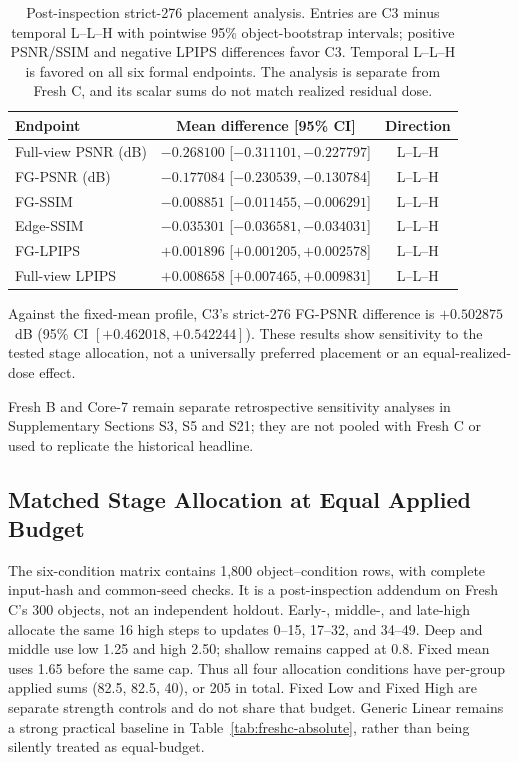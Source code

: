 \documentclass[times,twocolumn,final]{elsarticle}
\begin{document}
\begin{table}[t]
\centering
\scriptsize
\setlength{\tabcolsep}{4pt}
\caption{Post-inspection strict-276 placement analysis. Entries are C3 minus temporal L--L--H with pointwise 95\% object-bootstrap intervals; positive PSNR/SSIM and negative LPIPS differences favor C3. Temporal L--L--H is favored on all six formal endpoints. The analysis is separate from Fresh C, and its scalar sums do not match realized residual dose.}
\label{tab:temporal-placement}
\begin{tabular}{lcc}
\toprule
Endpoint & Mean difference [95\% CI] & Direction \\
\midrule
Full-view PSNR (dB) & $-0.268100$ [$-0.311101,-0.227797$] & L--L--H \\
FG-PSNR (dB) & $-0.177084$ [$-0.230539,-0.130784$] & L--L--H \\
FG-SSIM & $-0.008851$ [$-0.011455,-0.006291$] & L--L--H \\
Edge-SSIM & $-0.035301$ [$-0.036581,-0.034031$] & L--L--H \\
FG-LPIPS & $+0.001896$ [$+0.001205,+0.002578$] & L--L--H \\
Full-view LPIPS & $+0.008658$ [$+0.007465,+0.009831$] & L--L--H \\
\bottomrule
\end{tabular}
\end{table}

Against the fixed-mean profile, C3's strict-276 FG-PSNR difference is $+0.502875$~dB (95\% CI $[+0.462018,+0.542244]$). These results show sensitivity to the tested stage allocation, not a universally preferred placement or an equal-realized-dose effect.

Fresh B and Core-7 remain separate retrospective sensitivity analyses in Supplementary Sections S3, S5 and S21; they are not pooled with Fresh C or used to replicate the historical headline.

\subsection{Matched Stage Allocation at Equal Applied Budget}
\label{subsec:matched-budget300}
The six-condition matrix contains 1,800 object--condition rows, with complete input-hash and common-seed checks. It is a post-inspection addendum on Fresh C's 300 objects, not an independent holdout. Early-, middle-, and late-high allocate the same 16 high steps to updates 0--15, 17--32, and 34--49. Deep and middle use low 1.25 and high 2.50; shallow remains capped at 0.8. Fixed mean uses 1.65 before the same cap. Thus all four allocation conditions have per-group applied sums (82.5, 82.5, 40), or 205 in total. Fixed Low and Fixed High are separate strength controls and do not share that budget. Generic Linear remains a strong practical baseline in Table~\ref{tab:freshc-absolute}, rather than being silently treated as equal-budget.
\end{document}
